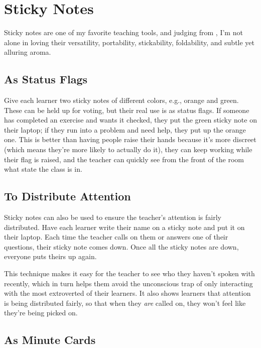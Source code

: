 \section{Sticky Notes}\label{s:classroom-sticky-notes}

Sticky notes are one of my favorite teaching tools, and judging from
\cite{Ward2015}, I'm not alone in loving their versatility,
portability, stickability, foldability, and subtle yet alluring aroma.

\subsection{As Status Flags}\label{as-status-flags}

Give each learner two sticky notes of different colors, e.g., orange and
green. These can be held up for voting, but their real use is as status
flags. If someone has completed an exercise and wants it checked, they
put the green sticky note on their laptop; if they run into a problem
and need help, they put up the orange one. This is better than having
people raise their hands because it's more discreet (which means they're
more likely to actually do it), they can keep working while their flag
is raised, and the teacher can quickly see from the front of the room
what state the class is in.

\subsection{To Distribute Attention}\label{to-distribute-attention}

Sticky notes can also be used to ensure the teacher's attention is
fairly distributed. Have each learner write their name on a sticky note
and put it on their laptop. Each time the teacher calls on them or
answers one of their questions, their sticky note comes down. Once all
the sticky notes are down, everyone puts theirs up again.

This technique makes it easy for the teacher to see who they haven't
spoken with recently, which in turn helps them avoid the unconscious
trap of only interacting with the most extroverted of their learners. It
also shows learners that attention is being distributed fairly, so that
when they \emph{are} called on, they won't feel like they're being picked on.

\subsection{As Minute Cards}\label{as-minute-cards}

